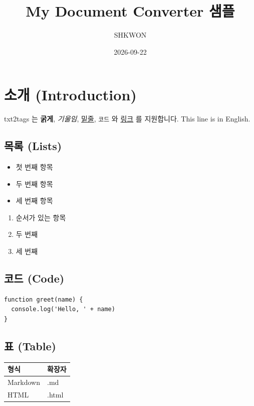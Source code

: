 \documentclass[11pt]{article}
\title{My Document Converter 샘플}
\author{SHKWON}
\date{2026-09-22}
\begin{document}
\maketitle

\section*{소개 (Introduction)}\label{소개-introduction}

txt2tags 는 \textbf{굵게}, \emph{기울임}, \underline{밑줄}, \verb|코드| 와
\href{https://example.com}{링크} 를 지원합니다.
This line is in English.

\subsection*{목록 (Lists)}\label{목록-lists}

\begin{itemize}
\item 첫 번째 항목
\item 두 번째 항목
\item 세 번째 항목
\end{itemize}

\begin{enumerate}
\item 순서가 있는 항목
\item 두 번째
\item 세 번째
\end{enumerate}

\subsection*{코드 (Code)}\label{코드-code}

\begin{verbatim}
function greet(name) {
  console.log('Hello, ' + name)
}
\end{verbatim}

\subsection*{표 (Table)}\label{표-table}

\begin{table}[htbp]
\centering
\begin{tabular}{ll}
\toprule
형식 & 확장자 \\
\midrule
Markdown & .md \\
HTML & .html \\
\bottomrule
\end{tabular}
\end{table}
\end{document}

